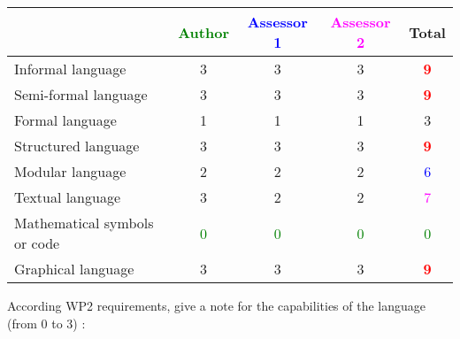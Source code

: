 \begin{tabular}{|l | c | c | c | c|}
\hline
& \textcolor{green}{Author} & \textcolor{blue}{Assessor 1} & \textcolor{magenta}{Assessor 2} & Total \\
\hline
Informal language & 3    & 3    & 3    & \textcolor{red}{\textbf{9}} \\
\hline
Semi-formal language & 3    & 3    & 3    & \textcolor{red}{\textbf{9}} \\
\hline
Formal language & 1    & 1    & 1    & 3    \\
\hline
Structured language & 3    & 3    & 3    & \textcolor{red}{\textbf{9}} \\
\hline
Modular language & 2    & 2    & 2    & \textcolor{blue}{6} \\
\hline
Textual language & 3    & 2    & 2    & \textcolor{magenta}{7} \\
\hline
Mathematical symbols or code & \textcolor{green}{0} & \textcolor{green}{0} & \textcolor{green}{0}  & \textcolor{green}{0} \\
\hline
Graphical language & 3    & 3    & 3    & \textcolor{red}{\textbf{9}} \\
\hline
\end{tabular}

According WP2 requirements, give a note for the capabilities of the language (from 0 to 3) :

